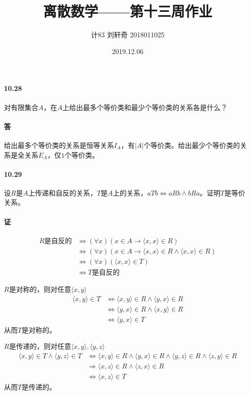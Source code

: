\documentclass[UTF8]{ctexart}
\title{离散数学——第十三周作业}
\author{计83  刘轩奇  2018011025}
\date{2019.12.06}
\begin{document}
\maketitle

\paragraph{10.28} \label{10.28}
    对有限集合$A$，在$A$上给出最多个等价类和最少个等价类的关系各是什么？

\paragraph{答}
    给出最多个等价类的关系是恒等关系$I_A$，有$|A|$个等价类。给出最少个等价类的关系是全关系$E_A$，仅$1$个等价类。

\paragraph{10.29} \label{10.29}
    设$R$是$A$上传递和自反的关系，$T$是$A$上的关系，$aTb \Longleftrightarrow aRb \land bRa$。证明$T$是等价关系。

\paragraph{证}
    \begin{align*}
        R \text{是自反的} & \Longleftrightarrow ( \forall x)(x \in A \longrightarrow \langle x,x \rangle \in R) \\
        & \Longleftrightarrow ( \forall x)(x \in A \longrightarrow \langle x,x \rangle \in R \land \langle x,x \rangle \in R) \\
        & \Longleftrightarrow ( \forall x)( \langle x,x \rangle \in T)  \\
        & \Longleftrightarrow T \text{是自反的}
    \end{align*}

    $R$是对称的，则对任意$ \langle x,y \rangle $
    \begin{align*}
        \langle x,y \rangle \in T & \Longleftrightarrow \langle x,y \rangle \in R \land \langle y,x \rangle \in R \\
        & \Longleftrightarrow \langle y,x \rangle \in R \land \langle x,y \rangle \in R \\
        & \Longleftrightarrow \langle y,x \rangle \in T 
    \end{align*}
    从而$T$是对称的。

    $R$是传递的，则对任意$ \langle x,y \rangle, \langle y,z \rangle $
    \begin{align*}
        \langle x,y \rangle \in T \land \langle y,z \rangle \in T & \Longleftrightarrow \langle x,y \rangle \in R \land \langle y,x \rangle \in R \land \langle y,z \rangle \in R \land \langle z,y \rangle \in R \\
        & \Longrightarrow \langle x,z \rangle \in R \land \langle z,x \rangle \in R \\
        & \Longleftrightarrow \langle x,z \rangle \in T
    \end{align*}
    从而$T$是传递的。
\end{document}
